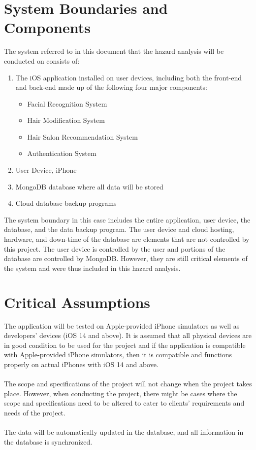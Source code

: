 \documentclass{article}
\begin{document}
\section{System Boundaries and Components}
The system referred to in this document that the hazard analysis will be conducted on consists of:
\begin{enumerate}
    \item The iOS application installed on user devices, including both the front-end and back-end made up of the following four major components:
    \begin{itemize}
        \item Facial Recognition System
        \item Hair Modification System
        \item Hair Salon Recommendation System
        \item Authentication System       
    \end{itemize}
    \item User Device, iPhone
    \item MongoDB database where all data will be stored
    \item Cloud database backup programs
\end{enumerate}

\noindent The system boundary in this case includes the entire application, user device, the database, and the data backup program. The user device and cloud hosting, hardware, and down-time of the database are elements that are not controlled by this project. The user device is controlled by the user and portions of the database are controlled by MongoDB. However, they are still critical elements of the system and were thus included in this hazard analysis.

\section{Critical Assumptions}
The application will be tested on Apple-provided iPhone simulators as well as developers' devices (iOS 14 and above). It is assumed that all physical devices are in good condition to be used for the project and if the application is compatible with Apple-provided iPhone simulators, then it is compatible and functions properly on actual iPhones with iOS 14 and above.\\
\\
\noindent The scope and specifications of the project will not change when the project takes place. However, when conducting the project, there might be cases where the scope and specifications need to be altered to cater to clients' requirements and needs of the project.\\
\\
\noindent The data will be automatically updated in the database, and all information in the database is synchronized.
\end{document}
